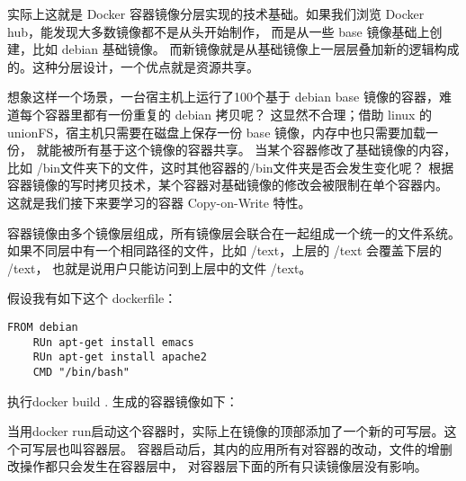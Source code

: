 实际上这就是 Docker 容器镜像分层实现的技术基础。如果我们浏览 Docker hub，能发现大多数镜像都不是从头开始制作，
而是从一些 base 镜像基础上创建，比如 debian 基础镜像。
而新镜像就是从基础镜像上一层层叠加新的逻辑构成的。这种分层设计，一个优点就是资源共享。

想象这样一个场景，一台宿主机上运行了100个基于 debian base 镜像的容器，难道每个容器里都有一份重复的 debian 拷贝呢？
这显然不合理；借助 linux 的 unionFS，宿主机只需要在磁盘上保存一份 base 镜像，内存中也只需要加载一份，
就能被所有基于这个镜像的容器共享。
当某个容器修改了基础镜像的内容，比如 /bin文件夹下的文件，这时其他容器的/bin文件夹是否会发生变化呢？
根据容器镜像的写时拷贝技术，某个容器对基础镜像的修改会被限制在单个容器内。
这就是我们接下来要学习的容器 Copy-on-Write 特性。

容器镜像由多个镜像层组成，所有镜像层会联合在一起组成一个统一的文件系统。
如果不同层中有一个相同路径的文件，比如 /text，上层的 /text 会覆盖下层的 /text，
也就是说用户只能访问到上层中的文件 /text。

假设我有如下这个 dockerfile：

\begin{lstlisting}[frame=shadowbox]
    FROM debian
    RUn apt-get install emacs
    RUn apt-get install apache2
    CMD "/bin/bash"
\end{lstlisting}

执行docker build .
生成的容器镜像如下：

当用docker run启动这个容器时，实际上在镜像的顶部添加了一个新的可写层。这个可写层也叫容器层。
容器启动后，其内的应用所有对容器的改动，文件的增删改操作都只会发生在容器层中，
对容器层下面的所有只读镜像层没有影响。

\newpage
